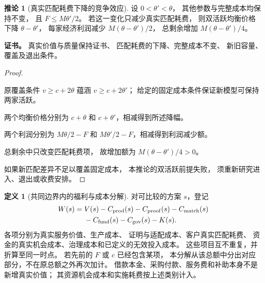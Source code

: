 \documentclass[UTF8,12pt,a4paper,openany,fontset=none,zihao=false]{ctexrep}
\theoremstyle{definition}
\newtheorem{definition}{定义}[chapter]
\newtheorem{corollary}{推论}[chapter]
\newenvironment{certificate}{\par\noindent\textbf{证书。}\ignorespaces}{\par}
\newcommand{\1}{\mathbf 1}
\begin{document}
\begin{corollary}[真实匹配耗费下降的竞争效应]
\label{comp:matching-saving}
设 \(0<\theta'<\theta\)，
其他参数与完整成本均保持不变，
且 \(F\le M\theta'/2\)。
若这一变化只减少真实匹配耗费，
则双活跃均衡价格下降 \(\theta-\theta'\)，
每家经济利润减少 \(M(\theta-\theta')/2\)，
总剩余增加 \(M(\theta-\theta')/4\)。
\end{corollary}
\begin{certificate}
真实价值与质量保持证书、
匹配耗费的下降、完整成本不变、
新旧容量、覆盖及退出条件。
\end{certificate}
\begin{proof}
\begin{semanticsteps}
\item 原覆盖条件 \(v\ge c+2\theta\)
蕴涵 \(v\ge c+2\theta'\)；
给定的固定成本条件保证新模型可保持两家活跃。
\item 两个均衡价格分别为 \(c+\theta\)
和 \(c+\theta'\)，相减得到所述降幅。
\item 两个利润分别为 \(M\theta/2-F\)
和 \(M\theta'/2-F\)，相减得到利润减少额。
\item 总剩余中只改变匹配耗费项，
故增加额为 \(M(\theta-\theta')/4>0\)。
\end{semanticsteps}
如果新匹配差异不足以覆盖固定成本，
本推论的双活跃前提失败，
须重新研究进入、退出或收费安排。
\end{proof}

\begin{definition}[共同边界内的福利与成本分解]
\label{comp:welfare-data}
对可比较的方案 \(s\)，登记
\[
 \begin{aligned}
 W(s)={}&V(s)-C_{\rm prod}(s)-C_{\rm proof}(s)
          -C_{\rm match}(s)\\
        &-C_{\rm fund}(s)-C_{\rm gov}(s)-K(s).
 \end{aligned}
\]
各项分别为真实服务价值、生产成本、
证明与适配成本、客户真实匹配耗费、
资金的真实机会成本、治理成本和已定义的无效投入成本。
这些项目互不重复，并折算至同一时点。
若先前的 \(F\) 或 \(c\) 已经包含某项，
本分解从该总额中分出对应部分，不在原总额之外再次加计。
借款本金、采购付款、服务费和补助本身不是新增真实价值；
其资源机会成本和实施耗费按上述类别计入。
\end{definition}
\end{document}
